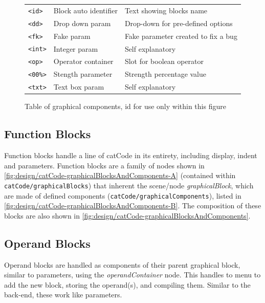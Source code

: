 \begin{fullwidthfigure}
\begin{subfigure}[T]{0.6\linewidth}
\begin{tabular}{lll}
            \texttt{<id>} & Block auto identifier & Text showing blocks name \\
            \texttt{<dd>} & Drop down param & Drop-down for pre-defined options \\
            \texttt{<fk>} & Fake param & Fake parameter created to fix a bug \\
            \texttt{<int>} & Integer param & Self explanatory \\
            \texttt{<op>} & Operator container & Slot for boolean operator \\
            \texttt{<00\%>} & Stength parameter & Strength percentage value \\
            \texttt{<txt>} & Text box param & Self explanatory
        \\ \bottomrule\end{tabular}
        \caption[Table of graphical components]{Table of graphical components, id for use only within this figure}
        \label{fig:design/catCode-graphicalBlocksAndComponents-B}
    \end{subfigure}
    \caption{Graphical components and graphical blocks.}
    \label{fig:design/catCode-graphicalBlocksAndComponents}
\end{fullwidthfigure}

\pagebreak %

\subsection{Function Blocks}

Function blocks handle a line of catCode in its entirety, including display, indent and parameters. Function blocks are a family of nodes shown in \autoref{fig:design/catCode-graphicalBlocksAndComponents-A} (contained within \texttt{catCode/graphicalBlocks}) that inherent the scene/node \textit{graphicalBlock}, which are made of defined components (\texttt{catCode/graphicalComponents}), listed in \autoref{fig:design/catCode-graphicalBlocksAndComponents-B}. The composition of these blocks are also shown in \autoref{fig:design/catCode-graphicalBlocksAndComponents}.

\subsection{Operand Blocks}

Operand blocks are handled as components of their parent graphical block, similar to parameters, using the \textit{operandContainer} node. This handles to menu to add the new block, storing the operand(s), and compiling them. Similar to the back-end, these work like parameters.

